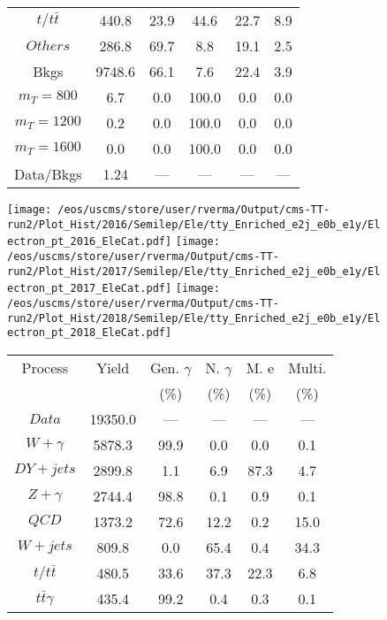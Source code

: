 \begin{figure}
\begin{minipage}[c]{0.32\textwidth}
{\begin{tabular}{cccccc}
$ t/t\bar{t} $ &  440.8 &  23.9 &  44.6 &  22.7 &  8.9\\
$ Others $ &  286.8 &  69.7 &  8.8 &  19.1 &  2.5\\
Bkgs &  9748.6 &  66.1 &  7.6 &  22.4 &  3.9\\
$ m_{T} = 800 $ &  6.7 &  0.0 &  100.0 &  0.0 &  0.0\\
$ m_{T} = 1200 $ &  0.2 &  0.0 &  100.0 &  0.0 &  0.0\\
$ m_{T} = 1600 $ &  0.0 &  0.0 &  100.0 &  0.0 &  0.0\\
Data/Bkgs &  1.24 &  --- &  --- &  --- &  ---\\
\hline
\end{tabular}
}
\end{minipage}
\end{figure}

\begin{figure}
\centering
\texttt{[image: /eos/uscms/store/user/rverma/Output/cms-TT-run2/Plot\_Hist/2016/Semilep/Ele/tty\_Enriched\_e2j\_e0b\_e1y/Electron\_pt\_2016\_EleCat.pdf]}
\texttt{[image: /eos/uscms/store/user/rverma/Output/cms-TT-run2/Plot\_Hist/2017/Semilep/Ele/tty\_Enriched\_e2j\_e0b\_e1y/Electron\_pt\_2017\_EleCat.pdf]}
\texttt{[image: /eos/uscms/store/user/rverma/Output/cms-TT-run2/Plot\_Hist/2018/Semilep/Ele/tty\_Enriched\_e2j\_e0b\_e1y/Electron\_pt\_2018\_EleCat.pdf]}
\begin{minipage}[c]{0.32\textwidth}
\centering
\tiny{
\begin{tabular}{cccccc}
\hline
Process & Yield & Gen. $\gamma$ & N. $\gamma$ & M. e & Multi. \\
 &  & (\%) & (\%) & (\%) & (\%)  \\
\hline
                                                                      $ Data $ &  19350.0 &  --- &  --- &  --- &  ---\\
$ W+\gamma $ &  5878.3 &  99.9 &  0.0 &  0.0 &  0.1\\
$ DY+jets $ &  2899.8 &  1.1 &  6.9 &  87.3 &  4.7\\
$ Z+\gamma $ &  2744.4 &  98.8 &  0.1 &  0.9 &  0.1\\
$ QCD $ &  1373.2 &  72.6 &  12.2 &  0.2 &  15.0\\
$ W+jets $ &  809.8 &  0.0 &  65.4 &  0.4 &  34.3\\
$ t/t\bar{t} $ &  480.5 &  33.6 &  37.3 &  22.3 &  6.8\\
$ t\bar{t}\gamma $ &  435.4 &  99.2 &  0.4 &  0.3 &  0.1\\

\end{tabular}}
\end{minipage}
\end{figure}
